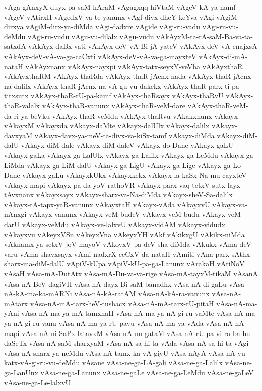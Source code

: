 {vAga-gAnxyX-duyx-pa-saM-hAraM
vAgagxqq-hiVtaM
vAgeV-kA-ya-namf
vAgeV-vAtirxH
vAgedxV-va-te-yanunx
vAgf-divx-dheY-keYva
vAgi
vAgiM-dirxya
vAgiM-dirx-ya-diMda
vAgi-dadxre
vAgide
vAgi-ru-vadu
vAgi-ru-vu-deMdu
vAgi-ru-vudu
vAgu-vu-dilalx
vAgu-vudu
vAkAyxM-ta-rA-saM-Ba-va-ta-satxdA
vAkAyx-daBx-vati
vAkAyx-deV-vA-Bi-jA-yateV
vAkAyx-deV-vA-cnajxsA
vAkAyx-deV-vA-va-ga-caCxti
vAkAyx-deV-vA-va-ga-mayxteV
vAkAyx-di-mA-nataH
vAkAyxnanx
vAkAyx-nayxpi
vAkAyx-tatx-seyxY-veVha
vAkAyxthaR
vAkAyxthaRM
vAkAyx-thaRda
vAkAyx-thaR-jAcnx-nada
vAkAyx-thaR-jAcnx-na-dalilx
vAkAyx-thaR-jAcnx-na-vA-gu-vu-dakekx
vAkAyx-thaR-parx-ti-pa-titxsutx
vAkAyx-thaR-rU-pa-kamf
vAkAyx-thaRsayx
vAkAyx-thaRvU
vAkAyx-thaR-valalx
vAkAyx-thaR-vanunx
vAkAyx-thaR-veM-dare
vAkAyx-thaR-veM-da-ri-ya-beVku
vAkAyx-thaR-veMdu
vAkAyx-thaRvu
vAkakxnunx
vAkayx
vAkayxM
vAkayxda
vAkayx-daMte
vAkayx-dalUlx
vAkayx-dalilx
vAkayx-davxyaM
vAkayx-davx-ya-meV-ta-divx-va-kiSx-tamf
vAkayx-diMda
vAkayx-diM-dalU
vAkayx-diM-dale
vAkayx-diM-daleV
vAkayx-do-Dane
vAkayx-gaLU
vAkayx-gaLa
vAkayx-ga-LalUlx
vAkayx-ga-Lalilx
vAkayx-ga-LeMdu
vAkayx-ga-LiMda
vAkayx-ga-LiM-dalU
vAkayx-ga-LigU
vAkayx-ga-Lige
vAkayx-ga-Lo-Dane
vAkayx-gaLu
vAkayxkUkx
vAkayxkekx
vAkayx-la-kaSx-Na-mu-cayxteV
vAkayx-mapi
vAkayx-pa-da-yoV-rathoVR
vAkayx-parx-vaq-tetxV-sutx-layx-tAvxnanx
vAkayxsayx
vAkayx-sharx-va-Na-diMda
vAkayx-sheV-Sa-dalilx
vAkayx-tA-tapx-yaR-vanunx
vAkayxtaH
vAkayx-vAda
vAkayxvU
vAkayx-va-nAnxgi
vAkayx-vanunx
vAkayx-veM-budeV
vAkayx-veM-budu
vAkayx-veM-darU
vAkayx-veMdu
vAkayx-ve-lalxvU
vAkayx-vidAM
vAkayx-vidudx
vAkayxvu
vAkeyxVSu
vAkeyxVna
vAkeyxYH
vAkf
vAkikxgU
vAkikx-niMda
vAknamx-ya-setxV-joV-mayoV
vAkoyxV-pa-deV-sha-diMda
vAkukx
vAma-deV-varu
vAma-shavxsayx
vAmi-nadxrX-ceCxV-da-nataH
vAmiti
vAna-parx-sAthx-sharx-ma-diM-dalU
vApiV-kUpa
vApiV-kU-pa-ga-Lanunx
vArakaH
vAriNoV
vAsaH
vAsa-mA-DutAtx
vAsa-mA-Du-va-va-rige
vAsa-mA-tayxM-tikaM
vAsanA
vAsa-nA-BeV-dagiVH
vAsa-nA-dayx-Bi-saM-banadhx
vAsa-nA-di-gaLu
vAsa-nA-kA-ma-ka-mARNi
vAsa-nA-kA-ratAM
vAsa-nA-kA-ra-vanunx
vAsa-nA-mAtarx
vAsa-nA-mA-tarx-heV-tushacx
vAsa-nA-mA-tarx-rU-pitaH
vAsa-nA-ma-yAni
vAsa-nA-ma-ya-mA-tamxnaH
vAsa-nA-ma-ya-nA-gi-ru-vaMte
vAsa-nA-ma-ya-nA-gi-ru-vanu
vAsa-nA-ma-ya-rU-pavu
vAsa-nA-ma-ya-vAda
vAsa-nA-nA-mapi
vAsa-nA-ni-SaPx-latavxM
vAsa-nA-nu-gataM
vAsa-nA-rU-pa-vi-ra-ba-hu-daSeTx
vAsa-nA-saM-sharxyaM
vAsa-nA-sa-hi-ta-vAda
vAsa-nA-sa-hi-ta-vAgi
vAsa-nA-sharx-ya-neMdu
vAsa-nA-tamx-ka-vA-giyU
vAsa-nAyA
vAsa-nA-yu-katx-vA-gi-ru-vu-deMdu
vAsane
vAsa-ne-ga-LA-gali
vAsa-ne-ga-Lalilx
vAsa-ne-ga-LanUnx
vAsa-ne-ga-Lanunx
vAsa-ne-gaLe
vAsa-ne-ga-LeMdu
vAsa-ne-gaLeV
vAsa-ne-ga-Le-lalxvU
}
